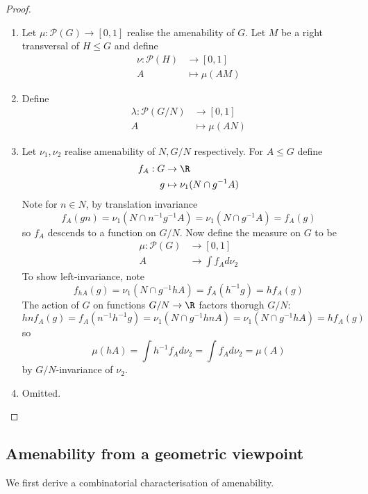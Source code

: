 \documentclass[a4paper]{article}
\begin{document}
\begin{proof}\leavevmode
  \begin{enumerate}
  \item Let \(\mu: \mathcal P(G) \to [0, 1]\) realise the amenability of \(G\). Let \(M\) be a right transversal of \(H \leq G\) and define
    \begin{align*}
      \nu: \mathcal P(H) &\to [0, 1] \\
      A &\mapsto \mu(AM)
    \end{align*}
  \item Define
    \begin{align*}
      \lambda: \mathcal P(G/N) &\to [0, 1] \\
      A &\mapsto \mu(AN)
    \end{align*}
  \item Let \(\nu_1, \nu_2\) realise amenability of \(N, G/N\) respectively. For \(A \leq G\) define
    \begin{align*}
      f_A: G &\to \R \\
      g &\mapsto \nu_1(N \cap g^{-1}A)
    \end{align*}
    Note for \(n \in N\), by translation invariance
    \[
      f_A(gn) = \nu_1(N \cap n^{-1}g^{-1}A) = \nu_1(N \cap g^{-1}A) = f_A(g)
    \]
    so \(f_A\) descends to a function on \(G/N\). Now define the measure on \(G\) to be
    \begin{align*}
      \mu: \mathcal P(G) &\to [0, 1] \\
      A &\to \int f_A d \nu_2
    \end{align*}
    To show left-invariance, note
    \[
      f_{hA}(g) = \nu_1(N \cap g^{-1}hA) = f_A(h^{-1}g) = h f_A(g)
    \]
    The action of \(G\) on functions \(G/N \to \R\) factors thorugh \(G/N\):
    \[
      hnf_A(g) = f_A(n^{-1}h^{-1}g) = \nu_1(N \cap g^{-1}hnA) = \nu_1(N \cap g^{-1}hA) = hf_A(g)
    \]
    so
    \[
      \mu(hA) = \int h^{-1}f_A d \nu_2 = \int f_A d \nu_2 = \mu(A)
    \]
    by \(G/N\)-invariance of \(\nu_2\).
  \item Omitted.
  \end{enumerate}
\end{proof}

\subsection{Amenability from a geometric viewpoint}

We first derive a combinatorial characterisation of amenability.
\end{document}
